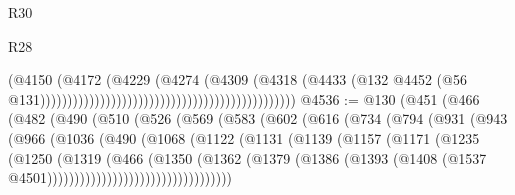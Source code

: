 \begin{lexlean}{R30}
\begin{lexlean}{R28}
\begin{coremodule}
{{{{{{{{{{{{{{{{{{{{{{{{{{{{{{{{{{{{{{{{{{{{{{{{{{{{{{{{{{{{{{{{{{{{{{{{{{{{{{{{{{{{{{{{{{{{{{{{{{{{{{{{{{{{{{{{{{{{{{{{{{{{{{{{{{{{{{{{{{{{{{{                                                                                (@4150
                                                                                  (@4172
                                                                                    (@4229
                                                                                      (@4274
                                                                                        (@4309
                                                                                          (@4318
                                                                                            (@4433
                                                                                              (@132
                                                                                                @4452
                                                                                                (@56
                                                                                                  @131)))))))))))))))))))))))))))))))))))))))))))))))
@4536 := @130
    (@451
      (@466
        (@482
          (@490
            (@510
              (@526
                (@569
                  (@583
                    (@602
                      (@616
                        (@734
                          (@794
                            (@931
                              (@943
                                (@966
                                  (@1036
                                    (@490
                                      (@1068
                                        (@1122
                                          (@1131
                                            (@1139
                                              (@1157
                                                (@1171
                                                  (@1235
                                                    (@1250
                                                      (@1319
                                                        (@466
                                                          (@1350
                                                            (@1362
                                                              (@1379
                                                                (@1386
                                                                  (@1393
                                                                    (@1408
                                                                      (@1537
                                                                        @4501))))))))))))))))))))))))))))))))))
}}}}}}}}}}}}}}}}}}}}}}}}}}}}}}}}}}}}}}}}}}}}}}}}}}}}}}}}}}}}}}}}}}}}}}}}}}}}}}}}}}}}}}}}}}}}}}}}}}}}}}}}}}}}}}}}}}}}}}}}}}}}}}}}}}}}}}}}}}}}}}}
\end{coremodule}
\end{lexlean}
\end{lexlean}
